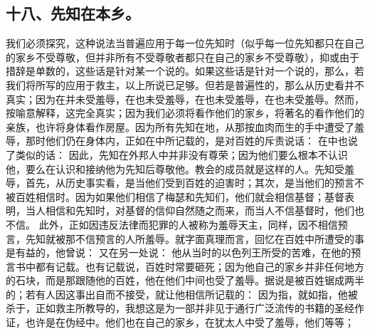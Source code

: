 
\subsection{十八、先知在本乡。}

  我们必须探究，这种说法当普遍应用于每一位先知时（似乎每一位先知都只在自己的家乡不受尊敬，但并非所有不受尊敬者都只在自己的家乡不受尊敬），抑或由于措辞是单数的，这些话是针对某一个说的。如果这些话是针对一个说的，那么，若我们将所写的应用于救主，以上所说已足够。但若是普遍性的，那么从历史看并不真实；因为在并未受羞辱，在也未受羞辱，在也未受羞辱，在也未受羞辱。然而，按喻意解释，这完全真实；因为我们必须将看作他们的家乡，将著名的看作他们的亲族，也许将身体看作房屋。因为所有先知在地，从那按血肉而生的手中遭受了羞辱，那时他们仍在身体内，正如在中所记载的，是对百姓的斥责说话：  在中也说了类似的话：  因此，先知在外邦人中并非没有尊荣；因为他们要么根本不认识他，要么在认识和接纳他为先知后尊敬他。教会的成员就是这样的人。先知受羞辱，首先，从历史事实看，是当他们受到百姓的迫害时；其次，是当他们的预言不被百姓相信时。因为如果他们相信了梅瑟和先知们，他们就会相信基督；基督表明，当人相信和先知时，对基督的信仰自然随之而来，而当人不信基督时，他们也不信。  此外，正如因违反法律而犯罪的人被称为羞辱天主，同样，因不相信预言，先知就被那不信预言的人所羞辱。就字面真理而言，回忆在百姓中所遭受的事是有益的，他曾说：  又在另一处说：  他从当时的以色列王所受的苦难，在他的预言书中都有记载。也有记载说，百姓时常要砸死；因为他自己的家乡并非任何地方的石块，而是那跟随他的百姓，他在他们中间也受了羞辱。据说是被百姓锯成两半的；若有人因这事出自而不接受，就让他相信所记载的：  因为指，就如指，他被杀于，正如救主所教导的，我想这是为一部并非见于通行广泛流传的书籍的圣经作证，也许是在伪经中。他们也在自己的家乡，在犹太人中受了羞辱，他们等等；    